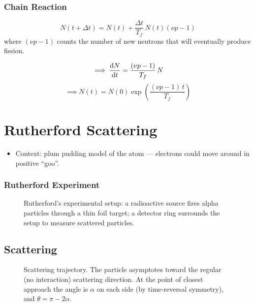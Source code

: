 \subsection*{Chain Reaction}

\[
    N(t + \Delta t) = N(t) + \frac{\Delta t}{T_f}\,N(t)(\nu p - 1)
\]
where $(\nu p - 1)$ counts the number of new neutrons that will eventually produce fission.

\[
    \implies \dv{N}{t} = \frac{(\nu p - 1)}{T_f}\,N
\]
\[
    \implies N(t) = N(0)\exp\!\left(\frac{(\nu p - 1)\,t}{T_f}\right)
\]

\chapter{Rutherford Scattering}


\begin{itemize}
    \item Context: plum pudding model of the atom --- electrons could move around in positive ``goo''.
\end{itemize}

\subsection*{Rutherford Experiment}

\begin{figure}[H]
    \centering
    \caption{Rutherford's experimental setup: a radioactive source fires alpha particles through a thin foil target; a detector ring surrounds the setup to measure scattered particles.}
\end{figure}

\section{Scattering}

\begin{figure}[H]
    \centering
    \caption{Scattering trajectory. The particle asymptotes toward the regular (no interaction) scattering direction. At the point of closest approach the angle is $\alpha$ on each side (by time-reversal symmetry), and $\theta = \pi - 2\alpha$.}
\end{figure}

